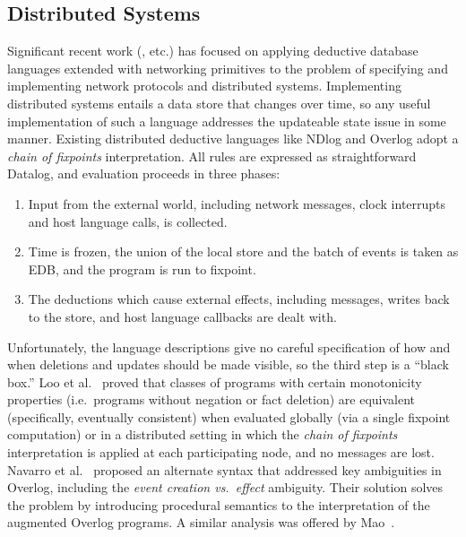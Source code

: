 \subsection{Distributed Systems}

Significant recent work (\cite{boom-techr,Chu:2007,Belaramani:2009,Loo2009-CACM}, etc.) has focused on applying deductive database languages extended with networking 
primitives to the problem of specifying and implementing network protocols and distributed systems.  Implementing distributed systems entails 
a data store that changes over time, so any useful implementation of such a language addresses the updateable state issue in some manner. 
Existing distributed deductive languages like NDlog and Overlog adopt a \emph{chain of fixpoints} interpretation.  All rules are expressed as 
straightforward Datalog, and evaluation proceeds in three phases:

\begin{enumerate}
\item Input from the external world, including network messages, clock interrupts and host language calls, is collected.
\item Time is frozen, the union of the local store and the batch of events is taken as EDB, and the program is run to fixpoint.
\item The deductions which cause external effects, including messages, writes back to the store, and host language callbacks are dealt with.  
\end{enumerate}

Unfortunately, the language descriptions give no careful specification of how and when deletions and updates
should be made visible, so the third step is a ``black box.''  Loo et al.~\cite{loo-sigmod06} proved that classes of programs with certain 
monotonicity properties (i.e.\ programs without negation or fact deletion)
are equivalent (specifically, eventually consistent) when evaluated globally (via a single fixpoint computation) or in a distributed setting in which the 
\emph{chain of fixpoints} interpretation is applied at each participating node, and no messages are lost.
Navarro et al.~\cite{navarro} proposed an alternate syntax that addressed key ambiguities in Overlog, including the
\emph{event creation vs.\ effect} ambiguity.  Their solution solves the problem by introducing procedural semantics to the interpretation of 
the augmented Overlog programs.  A similar analysis was offered by Mao~\cite{Mao2009}.


